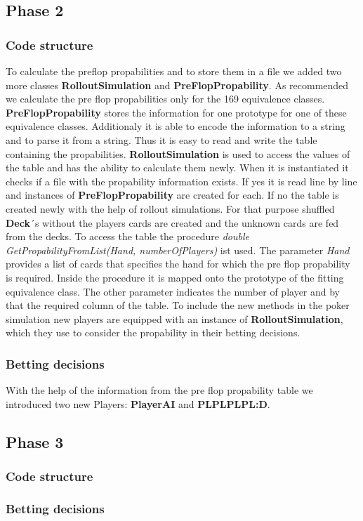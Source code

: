 \subsection{Phase 2}

\subsubsection{Code structure}

To calculate the preflop propabilities and to store them in a file we added two more classes \textbf{RolloutSimulation} and \textbf{PreFlopPropability}. As recommended we calculate the pre flop propabilities only for the 169 equivalence classes. \textbf{PreFlopPropability} stores the information for one prototype for one of these equivalence classes. Additionaly it is able to encode the information to a string and to parse it from a string. Thus it is easy to read and write the table containing the propabilities. 
\textbf{RolloutSimulation} is used to access the values of the table and has the ability to calculate them newly. When it is instantiated it checks if a file with the propability information exists. If yes it is read line by line and instances of \textbf{PreFlopPropability} are created for each. If no the table is created newly with the help of rollout simulations. For that purpose shuffled \textbf{Deck}´s without the players cards are created and the unknown cards are fed from the decks. To access the table the procedure \textit{double GetPropabilityFromList(Hand, numberOfPlayers)} ist used. The parameter \textit{Hand} provides a list of cards that specifies the hand for which the pre flop propability is required. Inside the procedure it is mapped onto the prototype of the fitting equivalence class. The other parameter indicates the number of player and by that the required column of the table.
To include the new methods in the poker simulation new players are equipped with an instance of \textbf{RolloutSimulation}, which they use to consider the propability in their betting decisions.

\subsubsection{Betting decisions}

With the help of the information from the pre flop propability table we introduced two new Players: \textbf{PlayerAI} and \textbf{PLPLPLPL:D}.

\subsection{Phase 3}

\subsubsection{Code structure}

\subsubsection{Betting decisions}


